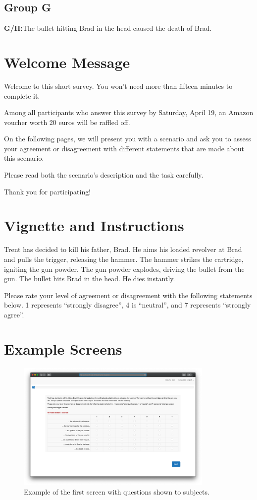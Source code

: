 \documentclass[12pt]{scrartcl}
\begin{document}
\subsection*{Group G}
\noindent\textbf{\textsf{G/H:}}\tab The bullet hitting Brad in the head caused the death of Brad.

\section{Welcome Message}
\label{app:welcome}
Welcome to this short survey. You won't need more than fifteen minutes to complete it.

Among all participants who answer this survey by Saturday, April 19, an Amazon voucher worth 20 euros will be raffled off.

On the following pages, we will present you with a scenario and ask you to assess your agreement or disagreement with different statements that are made about this scenario.

Please read both the scenario's description and the task carefully.

Thank you for participating!

\section{Vignette and Instructions}
\label{app:vignette}
Trent has decided to kill his father, Brad. He aims his loaded revolver at Brad and pulls the trigger, releasing the hammer. The hammer strikes the cartridge, igniting the gun powder. The gun powder explodes, driving the bullet from the gun. The bullet hits Brad in the head. He dies instantly.

Please rate your level of agreement or disagreement with the following statements below. 1 represents \enquote{strongly disagree}, 4 is \enquote{neutral}, and 7 represents \enquote{strongly agree}.

\section{Example Screens}
\label{app:screens}
\begin{figure}[H]
   \centering
   \includegraphics[width=0.85\textwidth]{figures/screen_1.png}
   \caption{Example of the first screen with questions shown to subjects.}
   \label{fig:screen_1}
\end{figure}
\end{document}
